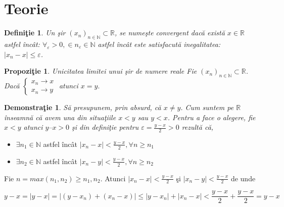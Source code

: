 \documentclass[a4paper,12pt,oneside]{report}
\newtheorem{definition}{Defini\c tie}
\newtheorem{proposition}{Propozi\c tie}
\newtheorem{demonstration}{Demonstra\c tie}
\begin{document}
\section{Teorie}

\begin{definition}

Un \c sir \((x_{n})_{n \in \mathbb{N}} \subset \mathbb{R} \), se nume\c ste convergent dac\u a exist\u a \(x \in \mathbb{R}\) astfel \^ inc\^ at:
\(\forall _{\varepsilon } > 0, \in n_{\varepsilon } \in \mathbb{N} \) astfel \^ inc\^ at este satisfacut\u a inegalitatea: \(\left | x_{n}- x \right | \leq \varepsilon \).

\end{definition}

\begin{proposition}

Unicitatea limitei unui \c sir de numere reale
Fie \((x_{n})_{n \in \mathbb{N}} \subset \mathbb{R}\). 
Dac\u a \(\left\{\begin{matrix}
x_{n} \to  x\\ 
x_{n} \to y
\end{matrix}\right.
\) atunci \(x=y.\)

\end{proposition}

\begin{demonstration}
  S\u a presupunem, prin absurd, c\u a \(x \neq  y\). Cum suntem pe \(\mathbb{R}\) \^ inseamn\u a c\u a avem una din situa\c tiile \(x < y\) sau \(y < x\). Pentru a face o alegere, fie \(x < y\) atunci \(y – x > 0\) \c si din defini\c tie pentru \(\varepsilon = \frac{y- x}{2}  > 0\) rezult\u a c\u a, 
\end{demonstration}


\begin{itemize}
  \item \(\exists  n_{1} \in \mathbb{N}\) astfel \^ inc\^ at \(\left | x_{n} - x  \right | < \frac{y - x }{2} , \forall n \geq n_{1} \)
  \item \(\exists  n_{2} \in \mathbb{N}\) astfel \^ inc\^ at \(\left | x_{n} - y  \right | < \frac{y - x }{2} , \forall n \geq n_{2} \)
\end{itemize}

Fie \(n = max (n _{1}, n_{2}) \geq n_{1}, n_{2}.\) Atunci \(\left | x_{n} - x \right | < \frac{y-x}{2}\) \c si \(\left | x_{n} - y  \right | <  \frac{y-x}{2}\) de unde 

\begin{displaymath}
  y-x = \left | y-x \right | = \left | (y-x_{n})+ (x_{n} -x) \right |\leq \left | y-x_{n} \right | + \left | x_{n} - x \right | < \frac{y-x}{2} + \frac{y-x}{2} = y-x
\end{displaymath}
\end{document}
